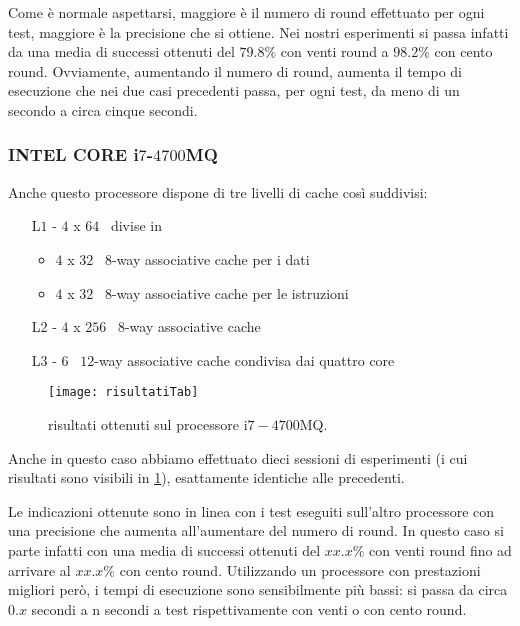 					Come è normale aspettarsi, maggiore è il numero di round effettuato per ogni test, maggiore è la precisione che si ottiene. Nei nostri esperimenti si passa infatti da una media di successi ottenuti del $79.8\%$ con venti round a $98.2\%$ con cento round. Ovviamente, aumentando il numero di round, aumenta il tempo di esecuzione che nei due casi precedenti passa, per ogni test, da meno di un secondo a circa cinque secondi.
					
				\subsubsection*{INTEL CORE i$7$-$4700$MQ} 
				
					Anche questo processore dispone di tre livelli di cache così suddivisi: 
					
					\begin{itemize}
						\item [L$1$ -] $4$ x $64$ \kilobyte \ divise in 
						\begin{itemize}
							\item  $4$ x $32$ \kilobyte \ $8$-way associative cache per i dati
							\item  $4$ x $32$ \kilobyte \ $8$-way associative cache per le istruzioni
						\end{itemize}
						\item[L$2$ -] $4$ x $256$ \kilobyte \ $8$-way associative cache
						\item[L$3$ -] $6$ \megabyte \ $12$-way associative cache condivisa dai quattro core
					\end{itemize}
					
					\begin{figure}
						\begin{center}
							\texttt{[image: risultatiTab]}
							\caption{risultati ottenuti sul processore i$7-4700$MQ.}
							\label{fig:risultati2}
						\end{center}
					\end{figure}
					
					Anche in questo caso abbiamo effettuato dieci sessioni di esperimenti (i cui risultati sono visibili in \cref{fig:risultati2}), esattamente identiche alle precedenti.
					
					Le indicazioni ottenute sono in linea con i test eseguiti sull'altro processore con una precisione che aumenta all'aumentare del numero di round. In questo caso si parte infatti con una media di successi ottenuti del $xx.x\%$ con venti round fino ad arrivare al $xx.x\%$ con cento round. Utilizzando un processore con prestazioni migliori però, i tempi di esecuzione sono sensibilmente più bassi: si passa da circa $0.x$ secondi a n secondi a test rispettivamente con venti o con cento round.
					